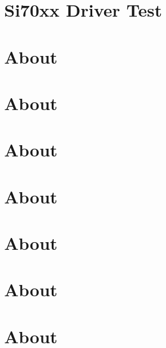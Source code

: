 \documentclass[twoside]{book}
\newcommand{\+}{\discretionary{\mbox{\scriptsize$\hookleftarrow$}}{}{}}
\begin{document}
\chapter{Si70xx Driver Test}
\label{md__home_ayush_RIOT_tests_driver_si70xx_README}

\chapter{About}
\label{md__home_ayush_RIOT_tests_driver_srf02_README}

\chapter{About}
\label{md__home_ayush_RIOT_tests_driver_srf08_README}

\chapter{About}
\label{md__home_ayush_RIOT_tests_driver_sx127x_README}

\chapter{About}
\label{md__home_ayush_RIOT_tests_driver_tcs37727_README}

\chapter{About}
\label{md__home_ayush_RIOT_tests_driver_tmp006_README}

\chapter{About}
\label{md__home_ayush_RIOT_tests_driver_tsl2561_README}

\chapter{About}
\label{md__home_ayush_RIOT_tests_driver_veml6070_Readme}

\end{document}
